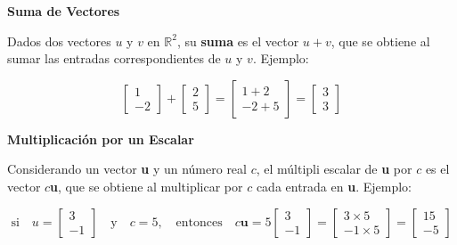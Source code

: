 \documentclass{article}
\begin{document}
\begin{large}
    \textbf{Suma de Vectores}
\end{large}

Dados dos vectores $u$ y $v$ en $\mathbb{R}^2$, su \textbf{suma} es el vector $u + v$, que se obtiene al sumar las entradas correspondientes de $u$ y $v$. Ejemplo:

\begin{equation*}
    \begin{bmatrix}
        1\\
        -2
    \end{bmatrix}
    + \begin{bmatrix}
        2\\
        5
    \end{bmatrix}
    = \begin{bmatrix}
        1 + 2 \\
        -2 + 5
    \end{bmatrix}
    = \begin{bmatrix}
        3 \\
        3
    \end{bmatrix}
\end{equation*}

\begin{large}
    \textbf{Multiplicación por un Escalar}
\end{large}

Considerando un vector \textbf{u} y un número real $c$, el múltipli escalar de \textbf{u} por $c$ es el vector $c$\textbf{u}, que se obtiene al multiplicar por $c$ cada entrada en \textbf{u}. Ejemplo:

\begin{equation*}
    \text{si} \quad u = \begin{bmatrix}
        3\\
        -1
    \end{bmatrix} 
    \quad \text{y} \quad c = 5, \quad \text{entonces} \quad
    c \textbf{u} = 5 \begin{bmatrix}
        3\\
        -1
    \end{bmatrix}
    = \begin{bmatrix}
        3 \times 5 \\
        -1 \times 5
    \end{bmatrix}
    = \begin{bmatrix}
        15 \\
        -5
    \end{bmatrix}
\end{equation*}
\end{document}
